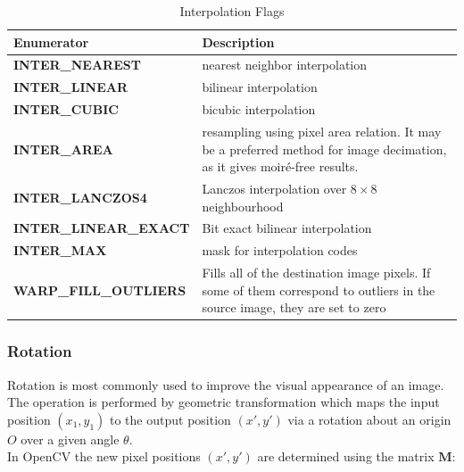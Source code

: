 \documentclass{article}
\theoremstyle{definition}
\theoremstyle{remark}
\begin{document}
\begin{table}[H]
    \centering
    \def\arraystretch{1.1}%
    \begin{tabular}{ p{5cm} p{7cm} } 
	\hline
	Enumerator & Description \\
	\hline
	\textbf{\footnotesize{INTER\_NEAREST}} & nearest neighbor interpolation \\

	\textbf{\footnotesize{INTER\_LINEAR}} & bilinear interpolation \\

	\textbf{\footnotesize{INTER\_CUBIC}} & bicubic interpolation \\

	\textbf{\footnotesize{INTER\_AREA}} & resampling using pixel area relation. It may be a preferred method for image decimation, as it gives moir\'e-free results.\\

	\textbf{\footnotesize{INTER\_LANCZOS4}} & Lanczos interpolation over $ 8 \times 8 $ neighbourhood \\

	\textbf{\footnotesize{INTER\_LINEAR\_EXACT}} & Bit exact bilinear interpolation \\

	\textbf{\footnotesize{INTER\_MAX}} & mask for interpolation codes \\

	\textbf{\footnotesize{WARP\_FILL\_OUTLIERS}} & Fills all of the destination image pixels. If some of them correspond to outliers in the source image, they are set to zero \\

	\hline
    \end{tabular}
    \caption{Interpolation Flags}
\end{table}


\subsubsection{Rotation}

Rotation is most commonly used to improve the visual appearance of an image. The operation is performed by geometric transformation which maps the input position $ (x_1, y_1) $ to the output position $ (x', y') $ via a rotation about an origin $ O $ over a given angle $ \theta $.\\

\noindent In OpenCV the new pixel positions $ (x', y') $ are determined using the matrix $ \pmb{M} $:
\end{document}
